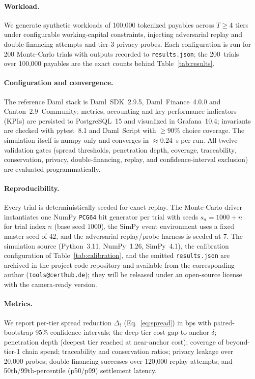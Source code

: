 \documentclass[10pt,twocolumn,letterpaper]{article}
\begin{document}
\paragraph{Workload.} We generate synthetic workloads of 100{,}000 tokenized payables
across $T\ge 4$ tiers under configurable working-capital constraints, injecting
adversarial replay and double-financing attempts and tier-3 privacy probes. Each
configuration is run for 200 Monte-Carlo trials with outputs recorded to
\texttt{results.json}; the 200~trials over 100{,}000 payables are the exact counts
behind Table~\ref{tab:results}.

\paragraph{Configuration and convergence.} The reference Daml stack is Daml~SDK~2.9.5,
Daml~Finance~4.0.0 and Canton~2.9~Community; metrics, accounting and key performance
indicators (KPIs) are persisted to PostgreSQL~15 and visualized in Grafana~10.4; invariants are checked with
pytest~8.1 and Daml~Script with $\ge 90\%$ choice coverage. The simulation itself is
numpy-only and converges in $\approx 0.24$~s per run. All twelve validation gates
(spread thresholds, penetration depth, coverage, traceability, conservation,
privacy, double-financing, replay, and confidence-interval exclusion) are
evaluated programmatically.

\paragraph{Reproducibility.} Every trial is deterministically seeded for exact
replay. The Monte-Carlo driver instantiates one NumPy \texttt{PCG64} bit generator
per trial with seeds $s_n=1000+n$ for trial index $n$ (base seed $1000$), the SimPy
event environment uses a fixed master seed of $42$, and the adversarial
replay/probe harness is seeded at $7$. The simulation source (Python~3.11,
NumPy~1.26, SimPy~4.1), the calibration configuration of
Table~\ref{tab:calibration}, and the emitted \texttt{results.json} are archived in
the project code repository and available from the corresponding author
(\texttt{tools@certhub.de}); they will be released under an open-source license with
the camera-ready version.

\paragraph{Metrics.} We report per-tier spread reduction $\Delta_t$
(Eq.~\ref{eq:spread}) in bps with paired-bootstrap 95\% confidence intervals; the
deep-tier cost gap to anchor $\delta$; penetration depth (deepest tier reached at
near-anchor cost); coverage of beyond-tier-1 chain spend; traceability and
conservation ratios; privacy leakage over 20{,}000 probes; double-financing successes
over 120{,}000 replay attempts; and 50th/99th-percentile (p50/p99) settlement latency.
\end{document}
